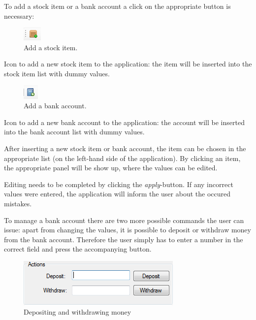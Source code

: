 To add a stock item or a bank account a click on the appropriate button is necessary:
 
\begin{figure} %
\centering
\includegraphics[scale=1]{gfx/add_stock_item.png}
\caption{Add a stock item.}
\label{fig:add_si}
\end{figure}

Icon to add a new stock item to the application: the item will be inserted into the stock item list with dummy values.

\begin{figure} %
\centering
\includegraphics[scale=1]{gfx/add_bank_account.png}
\caption{Add a bank account.}
\label{fig:add_ba}
\end{figure}

Icon to add a new bank account to the application: the account will be inserted into the bank account list with dummy values.

After inserting a new stock item or bank account, the item can be chosen in the appropriate list (on the left-hand side of the application). By clicking an item, the appropriate panel will be show up, where the values can be edited.

Editing needs to be completed by clicking the \textit{apply}-button. If any incorrect values were entered, the application will inform the user about the occured mistakes.

To manage a bank account there are two more possible commands the user can issue: apart from changing the values, it is possible to deposit or withdraw money from the bank account. Therefore the user simply has to enter a number in the correct field and press the accompanying button.

\begin{figure}[H]
\begin{center}
\includegraphics[scale=1.0]{gfx/bank_account_actions.png}
\caption{Depositing and withdrawing money}
\label{fig:ba_actions}
\end{center}
\end{figure}

